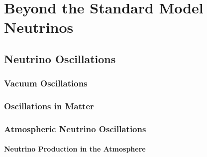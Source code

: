 \setchapterpreamble[u]{\margintoc}

\chapter{Beyond the Standard Model Neutrinos}


\section{Neutrino Oscillations} 

\subsection{Vacuum Oscillations}

\subsection{Oscillations in Matter}


\subsection{Atmospheric Neutrino Oscillations}

\subsubsection{Neutrino Production in the Atmosphere}

